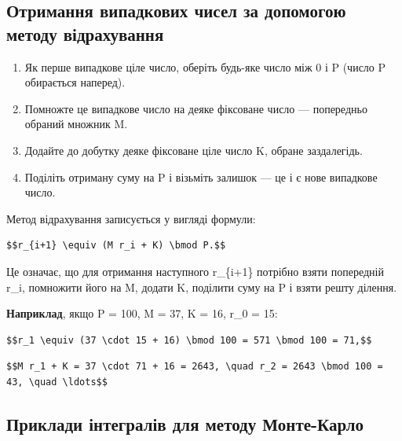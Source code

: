 \documentclass[
  ukrainian,
]{article}
\begin{document}
\subsection{Отримання випадкових чисел за допомогою методу
відрахування}\label{ux43eux442ux440ux438ux43cux430ux43dux43dux44f-ux432ux438ux43fux430ux434ux43aux43eux432ux438ux445-ux447ux438ux441ux435ux43b-ux437ux430-ux434ux43eux43fux43eux43cux43eux433ux43eux44e-ux43cux435ux442ux43eux434ux443-ux432ux456ux434ux440ux430ux445ux443ux432ux430ux43dux43dux44f}

\begin{enumerate}
\def\labelenumi{\arabic{enumi}.}
\item
  Як перше випадкове ціле число, оберіть будь-яке число між 0 і P (число
  P обирається наперед).
\item
  Помножте це випадкове число на деяке фіксоване число --- попередньо
  обраний множник M.
\item
  Додайте до добутку деяке фіксоване ціле число K, обране заздалегідь.
\item
  Поділіть отриману суму на P і візьміть залишок --- це і є нове
  випадкове число.
\end{enumerate}

Метод відрахування записується у вигляді формули:

\begin{verbatim}
$$r_{i+1} \equiv (M r_i + K) \bmod P.$$
\end{verbatim}

Це означає, що для отримання наступного r\_\{i+1\} потрібно взяти
попередній r\_i, помножити його на M, додати K, поділити суму на P і
взяти решту ділення.

\textbf{Наприклад}, якщо P = 100, M = 37, K = 16, r\_0 = 15:

\begin{verbatim}
$$r_1 \equiv (37 \cdot 15 + 16) \bmod 100 = 571 \bmod 100 = 71,$$
\end{verbatim}

\begin{verbatim}
$$M r_1 + K = 37 \cdot 71 + 16 = 2643, \quad r_2 = 2643 \bmod 100 = 43, \quad \ldots$$
\end{verbatim}

\subsection{Приклади інтегралів для методу
Монте-Карло}\label{ux43fux440ux438ux43aux43bux430ux434ux438-ux456ux43dux442ux435ux433ux440ux430ux43bux456ux432-ux434ux43bux44f-ux43cux435ux442ux43eux434ux443-ux43cux43eux43dux442ux435-ux43aux430ux440ux43bux43e}
\end{document}
